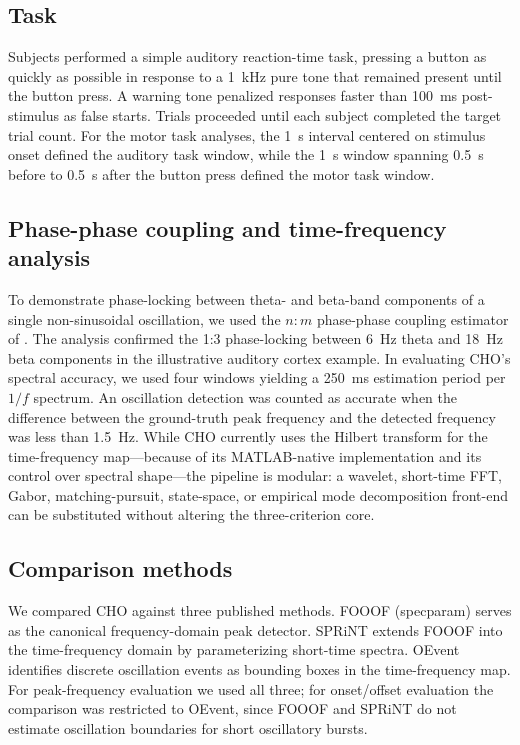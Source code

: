 \documentclass[11pt]{article}
\begin{document}
\subsection{Task}

Subjects performed a simple auditory reaction-time task, pressing a button as quickly as possible in response to a 1~kHz pure tone that remained present until the button press. A warning tone penalized responses faster than 100~ms post-stimulus as false starts. Trials proceeded until each subject completed the target trial count. For the motor task analyses, the 1~s interval centered on stimulus onset defined the auditory task window, while the 1~s window spanning 0.5~s before to 0.5~s after the button press defined the motor task window.

\subsection{Phase-phase coupling and time-frequency analysis}

To demonstrate phase-locking between theta- and beta-band components of a single non-sinusoidal oscillation, we used the $n{:}m$ phase-phase coupling estimator of \citet{belluscio2012crossfrequency}. The analysis confirmed the 1:3 phase-locking between 6~Hz theta and 18~Hz beta components in the illustrative auditory cortex example. In evaluating CHO's spectral accuracy, we used four windows yielding a 250~ms estimation period per $1/f$ spectrum. An oscillation detection was counted as accurate when the difference between the ground-truth peak frequency and the detected frequency was less than 1.5~Hz. While CHO currently uses the Hilbert transform for the time-frequency map---because of its MATLAB-native implementation and its control over spectral shape---the pipeline is modular: a wavelet, short-time FFT, Gabor, matching-pursuit, state-space, or empirical mode decomposition front-end \citep{quinn2021within} can be substituted without altering the three-criterion core.

\subsection{Comparison methods}

We compared CHO against three published methods. FOOOF (specparam) \citep{donoghue2020parameterizing} serves as the canonical frequency-domain peak detector. SPRiNT \citep{wilson2022sprint} extends FOOOF into the time-frequency domain by parameterizing short-time spectra. OEvent \citep{neymotin2022oevent} identifies discrete oscillation events as bounding boxes in the time-frequency map. For peak-frequency evaluation we used all three; for onset/offset evaluation the comparison was restricted to OEvent, since FOOOF and SPRiNT do not estimate oscillation boundaries for short oscillatory bursts.
\end{document}
